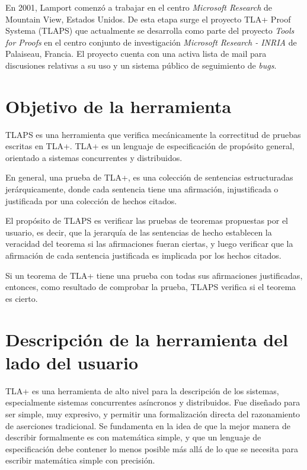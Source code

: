 \documentclass[spanish]{llncs}
\begin{document}
En 2001, Lamport comenzó a trabajar en el centro \textit{Microsoft Research} de Mountain View, Estados Unidos. De esta etapa surge el proyecto TLA+ Proof Systema (TLAPS) que actualmente se desarrolla como parte del proyecto \textit{Tools for Proofs} en el centro conjunto de investigación \textit{Microsoft Research - INRIA} de Palaiseau, Francia. El proyecto cuenta con una activa lista de mail para discusiones relativas a su uso y un sistema público de seguimiento de \textit{bugs}.


\section{Objetivo de la herramienta}

TLAPS es una herramienta que verifica mecánicamente la correctitud
de pruebas escritas en TLA+.
TLA+ es un lenguaje de especificación de propósito general, orientado a sistemas
concurrentes y distribuidos.

En general, una prueba de TLA+, es una colección de sentencias estructuradas jerárquicamente,
donde cada sentencia tiene una afirmación, injustificada o justificada por una colección de hechos citados.

El propósito de TLAPS es verificar las pruebas de teoremas propuestas por el usuario, es decir,
que la jerarquía de las sentencias de hecho establecen la veracidad del teorema si las afirmaciones fueran ciertas,
y luego verificar que la afirmación de cada sentencia justificada es implicada por los hechos citados.

Si un teorema de TLA+ tiene una prueba con todas sus afirmaciones justificadas, entonces, como resultado
de comprobar la prueba, TLAPS verifica si el teorema es cierto.

\section{Descripción de la herramienta del lado del usuario}

TLA+ es una herramienta de alto nivel para la descripción de los sistemas, especialmente sistemas concurrentes asíncronos y distribuidos. Fue diseñado para ser simple, muy expresivo, 
y permitir una formalización directa del razonamiento de aserciones tradicional.
Se fundamenta en la idea de que la mejor manera de describir formalmente es con matemática simple, y que un lenguaje de especificación debe contener lo menos posible más allá de lo 
que se necesita para escribir matemática simple con precisión.
\end{document}

